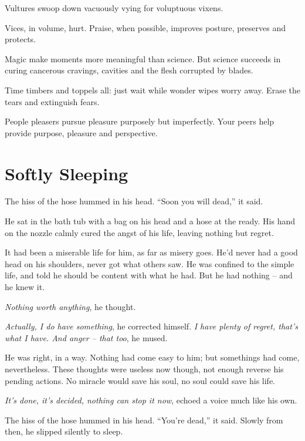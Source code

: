 \documentclass[fontsize=12pt,english]{scrreprt}
\begin{document}
Vultures swoop down vacuously vying for voluptuous vixens.

Vices, in volume, hurt. Praise, when possible, improves posture,
preserves and protects.

Magic make moments more meaningful than science. But science succeeds
in curing cancerous cravings, cavities and the flesh corrupted by
blades.

Time timbers and toppels all: just wait while wonder wipes worry
away. Erase the tears and extinguish fears.

People pleasers pursue pleasure purposely but imperfectly. Your peers
help provide purpose, pleasure and perspective.

\newpage

\section{Softly Sleeping}

The hiss of the hose hummed in his head. ``Soon you will dead,'' it
said.

He sat in the bath tub with a bag on his head and a hose at the
ready. His hand on the nozzle calmly cured the angst of his life,
leaving nothing but regret.

It had been a miserable life for him, as far as misery goes. He'd
never had a good head on his shoulders, never got what others saw. He
was confined to the simple life, and told he should be content with
what he had. But he had nothing -- and he knew it.

\textit{Nothing worth anything}, he thought.

\textit{Actually, I do have something}, he corrected
himself. \textit{I have plenty of regret, that's what I have. And
  anger -- that too}, he mused.

He was right, in a way. Nothing had come easy to him; but somethings
had come, nevertheless. These thoughts were useless now though, not
enough reverse his pending actions. No miracle would save his soul, no
soul could save his life.

\textit{It's done, it's decided, nothing can stop it now}, echoed a
voice much like his own.

The hiss of the hose hummed in his head. ``You're dead,'' it
said. Slowly from then, he slipped silently to sleep.

\newpage
\end{document}
